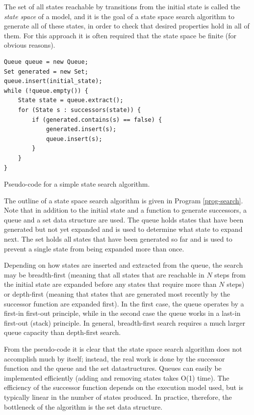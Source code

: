 \documentclass{acm_proc_article-sp}
\begin{document}
The set of all states reachable by transitions from the initial state is called
the \emph{state space} of a model, and it is the goal of a state space search
algorithm to generate all of these states, in order to check that desired
properties hold in all of them. For this approach it is often required that
the state space be finite (for obvious reasons).

\begin{program}
\begin{verbatim}
Queue queue = new Queue;
Set generated = new Set;
queue.insert(initial_state);
while (!queue.empty()) {
    State state = queue.extract();
    for (State s : successors(state)) {
        if (generated.contains(s) == false) {
            generated.insert(s);
            queue.insert(s);
        }
    }
}
\end{verbatim}
\caption{Pseudo-code for a simple state search algorithm.}
\label{prog-search}
\end{program}

The outline of a state space search algorithm is given in Program
\ref{prog-search}. Note that in addition to the initial state and a function
to generate successors, a queue and a set data structure are used. The queue
holds states that have been generated but not yet expanded and is used to
determine what state to expand next. The set holds all states that have been
generated so far and is used to prevent a single state from being expanded
more than once.

Depending on how states are inserted and extracted from the queue, the search
may be breadth-first (meaning that all states that are reachable in $N$ steps
from the initial state are expanded before any states that require more than
$N$ steps) or depth-first (meaning that states that are generated most recently
by the successor function are expanded first). In the first case, the queue
operates by a first-in first-out principle, while in the second case the queue
works in a last-in first-out (stack) principle. In general, breadth-first
search requires a much larger queue capacity than depth-first search.

From the pseudo-code it is clear that the state space search algorithm does not
accomplish much by itself; instead, the real work is done by the successor
function and the queue and the set datastructures. Queues can easily be
implemented efficiently (adding and removing states takes O(1) time).
The efficiency of the successor function depends on the execution model used,
but is typically linear in the number of states produced. In practice,
therefore, the bottleneck of the algorithm is the set data structure.
\end{document}
